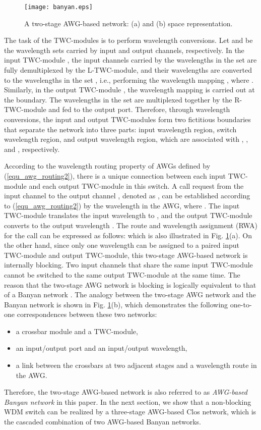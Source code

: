 \documentclass[journal]{IEEEtran}
\begin{document}
\begin{figure}[t]
\centering
\texttt{[image: banyan.eps]}
\caption{A two-stage AWG-based network: (a)  and
(b) space representation.}\label{f_banyan}
\end{figure}

The task of the TWC-modules is to perform wavelength conversions.
Let  and  be the wavelength sets carried by input
and output channels, respectively. In the input TWC-module ,
the input channels carried by the wavelengths in the set 
are fully demultiplexed by the L-TWC-module, and their wavelengths
are converted to the wavelengths in the set , i.e.,
performing the wavelength mapping
, where
. Similarly, in the output TWC-module ,
the wavelength mapping
 is carried out at the
boundary. The wavelengths in the set  are multiplexed
together by the R-TWC-module and fed to the output port. Therefore,
through wavelength conversions, the input and output TWC-modules
form two fictitious boundaries that separate the network into three
parts: input wavelength region, switch wavelength region, and output
wavelength region, which are associated with , ,
and , respectively.

According to the wavelength routing property of AWGs defined by
(\ref{equ_awg_routing2}), there is a unique connection between each
input TWC-module and each output TWC-module in this switch. A call
request from the input channel  to the output
channel , denoted as
, can be established according to
(\ref{equ_awg_routing2}) by the wavelength  in the AWG,
where . The input TWC-module 
translates the input wavelength  to ,
and the output TWC-module  converts  to the output
wavelength . The route and wavelength assignment
(RWA) for the call  can be expressed
as follows:
 which is also
illustrated in Fig. \ref{f_banyan}(a). On the other hand, since only
one wavelength can be assigned to a paired input TWC-module and
output TWC-module, this two-stage AWG-based network is internally
blocking. Two input channels that share the same input TWC-module
cannot be switched to the same output TWC-module at the same time.
The reason that the two-stage AWG network is blocking is logically
equivalent to that of a Banyan network \cite{Ttlee:book2011}. The
analogy between the two-stage AWG network and the Banyan network is
shown in Fig. \ref{f_banyan}(b), which demonstrates the following
one-to-one correspondences between these two networks:
\begin{itemize}
\item[(1)] a crossbar module and a TWC-module,
\item[(2)] an input/output port and an input/output wavelength,
\item[(3)] a link between the crossbars at two adjacent stages and a wavelength route in the AWG.
\end{itemize}
Therefore, the two-stage AWG-based network is also referred to as
\emph{AWG-based Banyan network} in this paper. In the next section,
we show that a non-blocking WDM switch can be realized by a
three-stage AWG-based Clos network, which is the cascaded
combination of two AWG-based Banyan networks.
\end{document}
